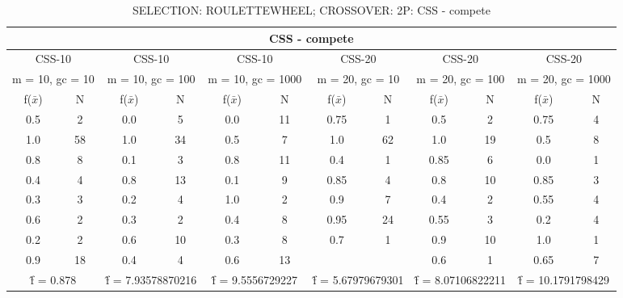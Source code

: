 \begin{table}[H]
	\centering
	\caption{SELECTION: ROULETTEWHEEL; CROSSOVER: 2P: CSS - compete}
	\begin{adjustbox}{width=1\textwidth}
		\begin{tabular}{ |c|c||c|c||c|c||c|c||c|c||c|c| }
			\hline
			\multicolumn{12}{|c|}{CSS - compete} \\
			\hline
			\multicolumn{2}{|c||}{CSS-10} & \multicolumn{2}{c||}{CSS-10} & \multicolumn{2}{c||}{CSS-10} & \multicolumn{2}{c||}{CSS-20} & \multicolumn{2}{c||}{CSS-20} & \multicolumn{2}{c|}{CSS-20}\\
			\hline
			\multicolumn{2}{|c||}{m = 10, gc = 10} & \multicolumn{2}{c||}{m = 10, gc = 100} & \multicolumn{2}{c||}{m = 10, gc = 1000} & \multicolumn{2}{c||}{m = 20, gc = 10} & \multicolumn{2}{c||}{m = 20, gc = 100} & \multicolumn{2}{c|}{m = 20, gc = 1000}\\
			\hline
			f($\bar{x}$) & N & f($\bar{x}$) & N & f($\bar{x}$) & N & f($\bar{x}$) & N & f($\bar{x}$) & N & f($\bar{x}$) & N\\
			\hline
			\hline
			0.5 & 2 & 0.0 & 5 & 0.0 & 11 & 0.75 & 1 & 0.5 & 2 & 0.75 & 4\\
			1.0 & 58 & 1.0 & 34 & 0.5 & 7 & 1.0 & 62 & 1.0 & 19 & 0.5 & 8\\
			0.8 & 8 & 0.1 & 3 & 0.8 & 11 & 0.4 & 1 & 0.85 & 6 & 0.0 & 1\\
			0.4 & 4 & 0.8 & 13 & 0.1 & 9 & 0.85 & 4 & 0.8 & 10 & 0.85 & 3\\
			0.3 & 3 & 0.2 & 4 & 1.0 & 2 & 0.9 & 7 & 0.4 & 2 & 0.55 & 4\\
			0.6 & 2 & 0.3 & 2 & 0.4 & 8 & 0.95 & 24 & 0.55 & 3 & 0.2 & 4\\
			0.2 & 2 & 0.6 & 10 & 0.3 & 8 & 0.7 & 1 & 0.9 & 10 & 1.0 & 1\\
			0.9 & 18 & 0.4 & 4 & 0.6 & 13 &   &   & 0.6 & 1 & 0.65 & 7\\
			\hline
			\multicolumn{2}{|c||}{\^{f} = 0.878} & \multicolumn{2}{c||}{\^{f} = 7.93578870216} & \multicolumn{2}{c||}{\^{f} = 9.5556729227} & \multicolumn{2}{c||}{\^{f} = 5.67979679301} & \multicolumn{2}{c||}{\^{f} = 8.07106822211} & \multicolumn{2}{c|}{\^{f} = 10.1791798429}\\
			\hline
		\end{tabular}
	\end{adjustbox}
\end{table}
